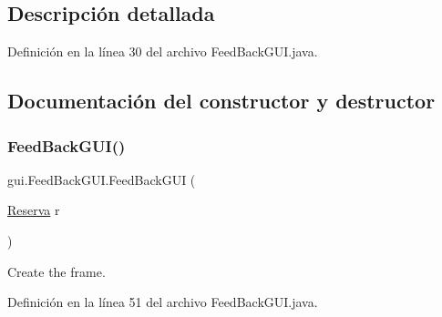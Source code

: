 \subsection{Descripción detallada}


Definición en la línea 30 del archivo Feed\+Back\+G\+U\+I.\+java.



\subsection{Documentación del constructor y destructor}
\mbox{\label{classgui_1_1_feed_back_g_u_i_a792ef572db37f3302efb1bf658ef2bd2}} 
\subsubsection{\texorpdfstring{FeedBackGUI()}{FeedBackGUI()}}
{\footnotesize\ttfamily gui.\+Feed\+Back\+G\+U\+I.\+Feed\+Back\+G\+UI (\begin{DoxyParamCaption}\item[{\mbox{\hyperlink{classdomain_1_1_reserva}{Reserva}}}]{r }\end{DoxyParamCaption})}



Create the frame. 



Definición en la línea 51 del archivo Feed\+Back\+G\+U\+I.\+java.


